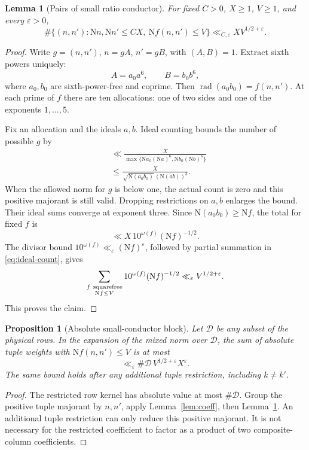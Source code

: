 \documentclass[11pt]{article}
\newtheorem{proposition}[theorem]{Proposition}
\newtheorem{lemma}[theorem]{Lemma}
\theoremstyle{definition}
\theoremstyle{remark}
\numberwithin{equation}{section}
\newcommand{\Nm}{\mathrm N}
\newcommand{\rad}{\operatorname{rad}}
\newcommand{\ee}{\varepsilon}
\begin{document}
\begin{lemma}[Pairs of small ratio conductor]\label{lem:pair-count}
For fixed $C>0$, $X\ge1$, $V\ge1$, and every $\ee>0$,
\begin{equation}\label{eq:pair-count}
\#\{(n,n'):\Nm n,\Nm n'\le CX,\ \Nm f(n,n')\le V\}
\ll_{C,\ee} X V^{1/2+\ee}.
\end{equation}
\end{lemma}
\begin{proof}
Write $g=(n,n')$, $n=gA$, $n'=gB$, with $(A,B)=1$. Extract sixth
powers uniquely:
\[
A=a_0a^6,\qquad B=b_0b^6,
\]
where $a_0,b_0$ are sixth-power-free and coprime. Then
$\rad(a_0b_0)=f(n,n')$. At each prime of $f$ there are ten allocations:
one of two sides and one of the exponents $1,\ldots,5$.

Fix an allocation and the ideals $a,b$. Ideal counting bounds the
number of possible $g$ by
\begin{align}
&\ll \frac{X}{\max\{\Nm a_0(\Nm a)^6,\Nm b_0(\Nm b)^6\}}\nonumber\\
&\le \frac{X}{\sqrt{\Nm(a_0b_0)}\,(\Nm(ab))^3}.
\label{eq:g-bound}
\end{align}
When the allowed norm for $g$ is below one, the actual count is zero
and this positive majorant is still valid. Dropping restrictions on
$a,b$ enlarges the bound. Their ideal sums converge at exponent three.
Since $\Nm(a_0b_0)\ge\Nm f$, the total for fixed $f$ is
\[
\ll X\,10^{\omega(f)}(\Nm f)^{-1/2}.
\]
The divisor bound $10^{\omega(f)}\ll_\ee(\Nm f)^\ee$, followed by
partial summation in \eqref{eq:ideal-count}, gives
\[
\sum_{\substack{f\ {\rm squarefree}\\\Nm f\le V}}
10^{\omega(f)}(\Nm f)^{-1/2}\ll_\ee V^{1/2+\ee}.
\]
This proves the claim.
\end{proof}

\begin{proposition}[Absolute small-conductor block]\label{prop:small}
Let $\mathcal D$ be any subset of the physical rows. In the expansion
of the mixed norm over $\mathcal D$, the sum of absolute tuple weights
with $\Nm f(n,n')\le V$ is at most
\begin{equation}\label{eq:small-block}
\ll_\ee \#\mathcal D\,V^{1/2+\ee}X^\ee.
\end{equation}
The same bound holds after any additional tuple restriction, including
$k\ne k'$.
\end{proposition}
\begin{proof}
The restricted row kernel has absolute value at most $\#\mathcal D$.
Group the positive tuple majorant by $n,n'$, apply
Lemma~\ref{lem:coeff}, then Lemma~\ref{lem:pair-count}. An additional
tuple restriction can only reduce this positive majorant. It is not
necessary for the restricted coefficient to factor as a product of
two composite-column coefficients.
\end{proof}
\end{document}
